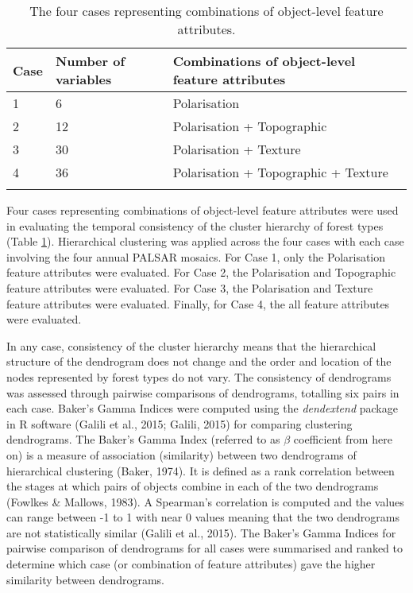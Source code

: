 \begin{spacing}{1.0}
\begin{longtable}[h!]{ p{2cm} p{2cm} p{9cm} }

    \caption[Four cases representing combinations of object-level feature attributes.]{The four cases representing combinations of object-level feature attributes.}
    \label{tab: method-table3.3}\\
    
    	\toprule
    	Case & Number of variables & Combinations of object-level feature attributes\\
       	\midrule
    	\endhead
    	
		1 & 6 & Polarisation\\
		2 & 12 & Polarisation + Topographic\\
		3 & 30 & Polarisation + Texture\\
		4 & 36 & Polarisation + Topographic + Texture\\
		
		\bottomrule \\
    
\end{longtable}
\end{spacing}

Four cases representing combinations of object-level feature attributes were used in evaluating the temporal consistency of the cluster hierarchy of forest types (Table \ref{tab: method-table3.3}). Hierarchical clustering was applied across the four cases with each case involving the four annual PALSAR mosaics. For Case 1, only the Polarisation feature attributes were evaluated. For Case 2, the Polarisation and Topographic feature attributes were evaluated. For Case 3, the Polarisation and Texture feature attributes were evaluated. Finally, for Case 4, the all feature attributes were evaluated.

In any case, consistency of the cluster hierarchy means that the hierarchical structure of the dendrogram does not change and the order and location of the nodes represented by forest types do not vary. The consistency of dendrograms was assessed through pairwise comparisons of dendrograms, totalling six pairs in each case. Baker's Gamma Indices were computed using the \textit{dendextend} package in R software (Galili et al., 2015; Galili, 2015) for comparing clustering dendrograms. The Baker’s Gamma Index (referred to as $\beta$ coefficient from here on) is a measure of association (similarity) between two dendrograms of hierarchical clustering (Baker, 1974). It is defined as a rank correlation between the stages at which pairs of objects combine in each of the two dendrograms (Fowlkes \& Mallows, 1983). A Spearman's correlation is computed and the values can range between -1 to 1 with near 0 values meaning that the two dendrograms are not statistically similar (Galili et al., 2015). The Baker's Gamma Indices for pairwise comparison of dendrograms for all cases were summarised and ranked to determine which case (or combination of feature attributes) gave the higher similarity between dendrograms.

